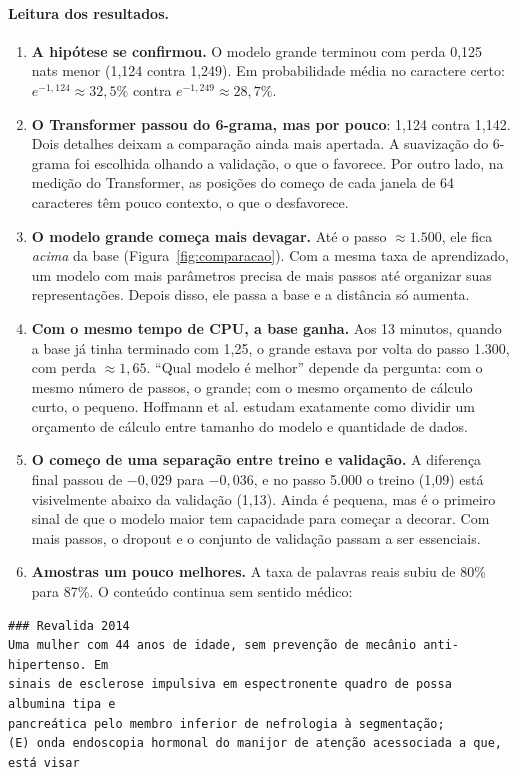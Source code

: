 \paragraph{Leitura dos resultados.}
\begin{enumerate}
\item \textbf{A hipótese se confirmou.} O modelo grande terminou com perda 0,125 nats menor (1,124 contra 1,249). Em probabilidade média no caractere certo: $e^{-1{,}124} \approx 32{,}5\%$ contra $e^{-1{,}249} \approx 28{,}7\%$.
\item \textbf{O Transformer passou do 6-grama, mas por pouco}: 1,124 contra 1,142. Dois detalhes deixam a comparação ainda mais apertada. A suavização do 6-grama foi escolhida olhando a validação, o que o favorece. Por outro lado, na medição do Transformer, as posições do começo de cada janela de 64 caracteres têm pouco contexto, o que o desfavorece.
\item \textbf{O modelo grande começa mais devagar.} Até o passo $\approx 1.500$, ele fica \emph{acima} da base (Figura~\ref{fig:comparacao}). Com a mesma taxa de aprendizado, um modelo com mais parâmetros precisa de mais passos até organizar suas representações. Depois disso, ele passa a base e a distância só aumenta.
\item \textbf{Com o mesmo tempo de CPU, a base ganha.} Aos 13 minutos, quando a base já tinha terminado com 1,25, o grande estava por volta do passo 1.300, com perda $\approx 1{,}65$. ``Qual modelo é melhor'' depende da pergunta: com o mesmo número de passos, o grande; com o mesmo orçamento de cálculo curto, o pequeno. Hoffmann et al. \cite{hoffmann} estudam exatamente como dividir um orçamento de cálculo entre tamanho do modelo e quantidade de dados.
\item \textbf{O começo de uma separação entre treino e validação.} A diferença final passou de $-0{,}029$ para $-0{,}036$, e no passo 5.000 o treino (1,09) está visivelmente abaixo da validação (1,13). Ainda é pequena, mas é o primeiro sinal de que o modelo maior tem capacidade para começar a decorar. Com mais passos, o dropout e o conjunto de validação passam a ser essenciais.
\item \textbf{Amostras um pouco melhores.} A taxa de palavras reais subiu de 80\% para 87\%. O conteúdo continua sem sentido médico:
\end{enumerate}

\begin{lstlisting}[language={},basicstyle=\ttfamily\footnotesize]
### Revalida 2014
Uma mulher com 44 anos de idade, sem prevenção de mecânio anti-hipertenso. Em
sinais de esclerose impulsiva em espectronente quadro de possa albumina tipa e
pancreática pelo membro inferior de nefrologia à segmentação;
(E) onda endoscopia hormonal do manijor de atenção acessociada a que, está visar
\end{lstlisting}

